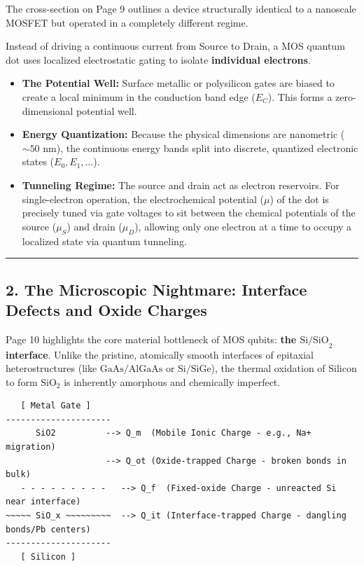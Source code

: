 \documentclass[
]{article}
\providecommand{\tightlist}{%
  \setlength{\itemsep}{0pt}\setlength{\parskip}{0pt}}
\begin{document}
The cross-section on Page 9 outlines a device structurally identical to
a nanoscale MOSFET but operated in a completely different regime.

Instead of driving a continuous current from Source to Drain, a MOS
quantum dot uses localized electrostatic gating to isolate
\textbf{individual electrons}.

\begin{itemize}
\tightlist
\item
  \textbf{The Potential Well:} Surface metallic or polysilicon gates are
  biased to create a local minimum in the conduction band edge
  (\(E_C\)). This forms a zero-dimensional potential well.
\item
  \textbf{Energy Quantization:} Because the physical dimensions are
  nanometric (\(\sim 50\text{ nm}\)), the continuous energy bands split
  into discrete, quantized electronic states (\(E_0, E_1, \dots\)).
\item
  \textbf{Tunneling Regime:} The source and drain act as electron
  reservoirs. For single-electron operation, the electrochemical
  potential (\(\mu\)) of the dot is precisely tuned via gate voltages to
  sit between the chemical potentials of the source (\(\mu_S\)) and
  drain (\(\mu_D\)), allowing only one electron at a time to occupy a
  localized state via quantum tunneling.
\end{itemize}

\begin{center}\rule{0.5\linewidth}{0.5pt}\end{center}

\subsection{2. The Microscopic Nightmare: Interface Defects and Oxide
Charges}\label{the-microscopic-nightmare-interface-defects-and-oxide-charges}

Page 10 highlights the core material bottleneck of MOS qubits:
\textbf{the \(\text{Si/SiO}_2\) interface}. Unlike the pristine,
atomically smooth interfaces of epitaxial heterostructures (like
\(\text{GaAs/AlGaAs}\) or \(\text{Si/SiGe}\)), the thermal oxidation of
Silicon to form \(\text{SiO}_2\) is inherently amorphous and chemically
imperfect.

\begin{verbatim}
   [ Metal Gate ]
---------------------
      SiO2          --> Q_m  (Mobile Ionic Charge - e.g., Na+ migration)
                    --> Q_ot (Oxide-trapped Charge - broken bonds in bulk)
   - - - - - - - - -   --> Q_f  (Fixed-oxide Charge - unreacted Si near interface)
~~~~~ SiO_x ~~~~~~~~~  --> Q_it (Interface-trapped Charge - dangling bonds/Pb centers)
---------------------
   [ Silicon ]
\end{verbatim}
\end{document}
